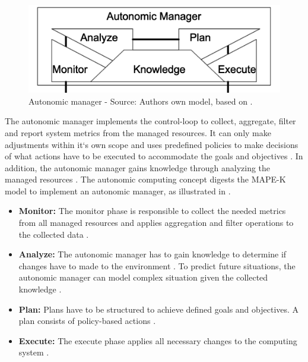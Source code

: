 \begin{figure}[h]%
\centering
\includegraphics[scale=1]{images/04_technical_background/ac_autonomic_manager}%
\caption{Autonomic manager - Source: Authors own model, based on \cite{Jacob2004AutonomicSolution}.}%
\label{fig:ac_manager}%
\end{figure}

The autonomic manager implements the control-loop to collect, aggregate, filter and report system metrics from the managed resources. It can only make adjustments within it`s own scope and uses predefined policies to make decisions of what actions have to be executed to accommodate the goals and objectives \cite{Murch2004Autonomic, Sinreich2006AnAB}.
In addition, the autonomic manager gains knowledge through analyzing the managed resources \cite{Murch2004Autonomic}.
The autonomic computing concept digests the MAPE-K model to implement an autonomic manager, as illustrated in  \cite{Goscinski2011CloudComputing}.

\begin{itemize}
\item \textbf{Monitor:}
The monitor phase is responsible to collect the needed metrics from all managed resources and applies aggregation and filter operations to the collected data \cite{Sinreich2006AnAB}.

\item \textbf{Analyze:}
The autonomic manager has to gain knowledge to determine if changes have to made to the environment \cite{Sinreich2006AnAB}. To predict future situations, the autonomic manager can model complex situation given the collected knowledge \cite{Jacob2004AutonomicSolution}.

\item \textbf{Plan:}
Plans have to be structured to achieve defined goals and objectives. A plan consists of policy-based actions \cite{Jacob2004AutonomicSolution, Sinreich2006AnAB}.

\item \textbf{Execute:}
The execute phase applies all necessary changes to the computing system \cite{Sinreich2006AnAB}.
\end{itemize}

